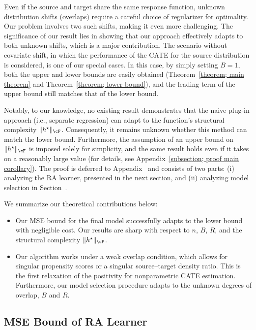 \documentclass[12pt,a4paper,pdftex,onepage]{article}
\begin{document}
Even if the source and target share the same response function, unknown distribution shifts (overlaps) require a careful choice of regularizer for optimality. 
Our problem involves two such shifts, making it even more challenging. 
The significance of our result lies in showing that our approach effectively adapts to both unknown shifts, which is a major contribution.
The scenario without covariate shift, in which the performance of the CATE for the source distribution is considered, is one of our special cases.
In this case, by simply setting $B=1$, both the upper and lower bounds are easily obtained (Theorem~\ref{theorem; main theorem} and Theorem~\ref{theorem; lower bound}), and the leading term of the upper bound still matches that of the lower bound.

Notably, to our knowledge, no existing result demonstrates that the naive plug-in approach
(i.e., separate regression) can adapt to the function’s structural complexity \(\|h^\star\|_\cF\).
Consequently, it remains unknown whether this method can match the lower bound.
Furthermore, the assumption of an upper bound on $\|h^\star\|_{\cF}$ is imposed solely for simplicity, and the same result holds even if it takes on a reasonably large value (for details, see Appendix~\ref{subsection; proof main corollary}).
The proof is deferred to Appendix~ and consists of two parts: 
(i) analyzing the RA learner, presented in the next section, and 
(ii) analyzing model selection in Section~.




We summarize our theoretical contributions below:
\begin{itemize}
\item Our MSE bound for the final model successfully adapts to the lower bound with negligible cost. 
Our results are sharp with respect to \(n\), \(B\), \(R\), and the structural complexity \(\|h^\star\|_{\cF}\).
\item Our algorithm works under a weak overlap condition, which allows for singular propensity scores or a singular source–target density ratio. 
This is the first relaxation of the positivity for nonparametric CATE estimation. 
Furthermore, our model selection procedure adapts to the unknown degrees of overlap, \(B\) and \(R\).
\end{itemize}


\subsection{MSE Bound of RA Learner}
\end{document}
